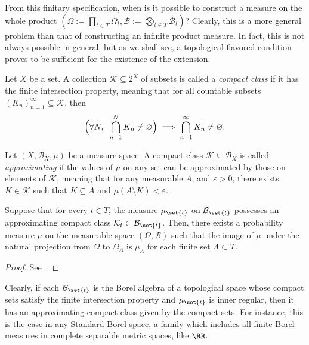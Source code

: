 \documentclass[../main]{subfiles}
\begin{document}
From this finitary specification, when is it possible to construct a measure on the whole product $\left(\Omega:=\prod_{t \in T} \Omega_t, \mathcal{B}:=\bigotimes_{t \in T} \mathcal{B}_t\right)$? Clearly, this is a more general problem than that of constructing an infinite product measure. In fact, this is not always possible in general, but as we shall see, a topological-flavored condition proves to be sufficient for the existence of the extension.

\begin{definition}
  Let \(X\) be a set. A collection \(\mathcal{K} \subseteq 2^X\) of subsets is called a \emph{compact class} if it has the finite intersection property, meaning that for all countable subsets \((K_n)_{n = 1}^{\infty} \subseteq \mathcal{K}\), then
  \[\rpar[\Big]{\forall N,\;\; \bigcap_{n = 1}^N K_n \neq \varnothing} \implies \bigcap_{n = 1}^{\infty}K_n \neq \varnothing.\]
\end{definition}

\begin{definition}\label{def:approximating-class}
  Let \((X,\mathcal{B}_X,\mu)\) be a measure space. A compact class \(\mathcal{K} \subseteq \mathcal{B}_X\) is called \emph{approximating} if the values of \(\mu\) on any set can be approximated by those on elements of \(\mathcal{K}\), meaning that for any measurable \(A\), and \(\varepsilon > 0\), there exists \(K \in \mathcal{K}\) such that \(K \subseteq A\) and \(\mu(A \setminus K) < \varepsilon\).
\end{definition}

\begin{theorem}\label{thm:kolmogorov-ext}
  Suppose that for every $t \in T$, the measure $\mu_{\set{t}}$ on $\mathcal{B}_{\set{t}}$ possesses an approximating compact class $\mathcal{K}_{t} \subset \mathcal{B}_{\set{t}}$. Then, there exists a probability measure $\mu$ on the measurable space $(\Omega, \mathcal{B})$ such that the image of $\mu$ under the natural projection from $\Omega$ to $\Omega_{\Lambda}$ is $\mu_{\Lambda}$ for each finite set $\Lambda \subset T$.
\end{theorem}

\begin{proof}
  See~\cite[Theorem 7.7.1]{bogachevMeasureTheory2007}.
\end{proof}

\begin{remark}
  Clearly, if each \(\mathcal{B}_{\set{t}}\) is the Borel algebra of a topological space whose compact sets satisfy the finite intersection property and \(\mu_{\set{t}}\) is inner regular, then it has an approximating compact class given by the compact sets. For instance, this is the case in any Standard Borel space, a family which includes all finite Borel measures in complete separable metric spaces, like \(\RR\).
\end{remark}
\end{document}
